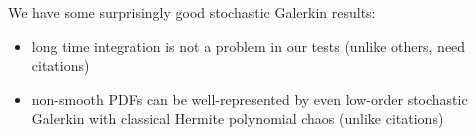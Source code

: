\documentclass[Journal,letterpaper,InsideFigs,SingleSpace,NoLineNumbers]{ascelike-new}
\begin{document}
We have some surprisingly good stochastic Galerkin results:
\begin{itemize}
    \item long time integration is not a problem in our tests (unlike others, need citations)
    \item non-smooth PDFs can be well-represented by even low-order stochastic Galerkin with classical Hermite polynomial chaos (unlike citations)
\end{itemize}






\end{document}
